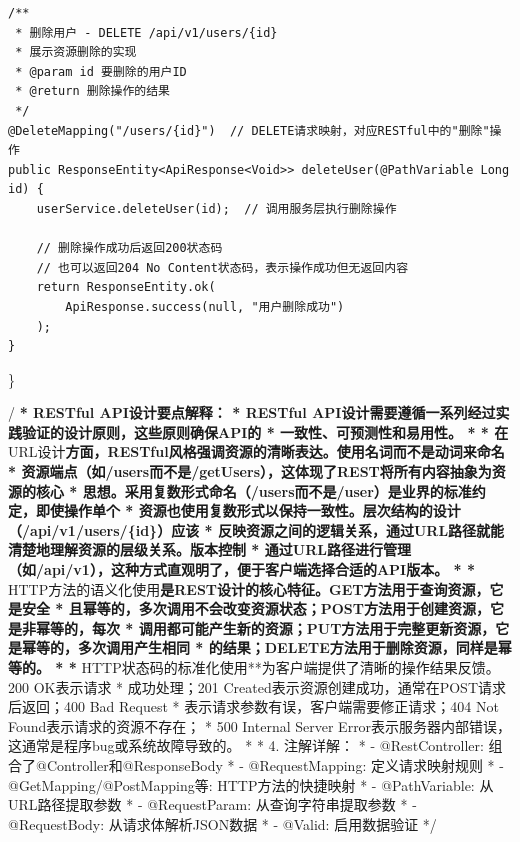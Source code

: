 \begin{verbatim}
/**
 * 删除用户 - DELETE /api/v1/users/{id}
 * 展示资源删除的实现
 * @param id 要删除的用户ID
 * @return 删除操作的结果
 */
@DeleteMapping("/users/{id}")  // DELETE请求映射，对应RESTful中的"删除"操作
public ResponseEntity<ApiResponse<Void>> deleteUser(@PathVariable Long id) {
    userService.deleteUser(id);  // 调用服务层执行删除操作
    
    // 删除操作成功后返回200状态码
    // 也可以返回204 No Content状态码，表示操作成功但无返回内容
    return ResponseEntity.ok(
        ApiResponse.success(null, "用户删除成功")
    );
}
\end{verbatim}

\}

/\textbf{ * RESTful API设计要点解释： * RESTful API设计需要遵循一系列经过实践验证的设计原则，这些原则确保API的 * 一致性、可预测性和易用性。 * * 在}URL设计\textbf{方面，RESTful风格强调资源的清晰表达。使用名词而不是动词来命名 * 资源端点（如/users而不是/getUsers），这体现了REST将所有内容抽象为资源的核心 * 思想。采用复数形式命名（/users而不是/user）是业界的标准约定，即使操作单个 * 资源也使用复数形式以保持一致性。层次结构的设计（/api/v1/users/\{id\}）应该 * 反映资源之间的逻辑关系，通过URL路径就能清楚地理解资源的层级关系。版本控制 * 通过URL路径进行管理（如/api/v1），这种方式直观明了，便于客户端选择合适的API版本。 * * }HTTP方法的语义化使用\textbf{是REST设计的核心特征。GET方法用于查询资源，它是安全 * 且幂等的，多次调用不会改变资源状态；POST方法用于创建资源，它是非幂等的，每次 * 调用都可能产生新的资源；PUT方法用于完整更新资源，它是幂等的，多次调用产生相同 * 的结果；DELETE方法用于删除资源，同样是幂等的。 * * }HTTP状态码的标准化使用**为客户端提供了清晰的操作结果反馈。200 OK表示请求 * 成功处理；201 Created表示资源创建成功，通常在POST请求后返回；400 Bad Request * 表示请求参数有误，客户端需要修正请求；404 Not Found表示请求的资源不存在； * 500 Internal Server Error表示服务器内部错误，这通常是程序bug或系统故障导致的。 * * 4. 注解详解： * - @RestController: 组合了@Controller和@ResponseBody * - @RequestMapping: 定义请求映射规则 * - @GetMapping/@PostMapping等: HTTP方法的快捷映射 * - @PathVariable: 从URL路径提取参数 * - @RequestParam: 从查询字符串提取参数 * - @RequestBody: 从请求体解析JSON数据 * - @Valid: 启用数据验证 */

